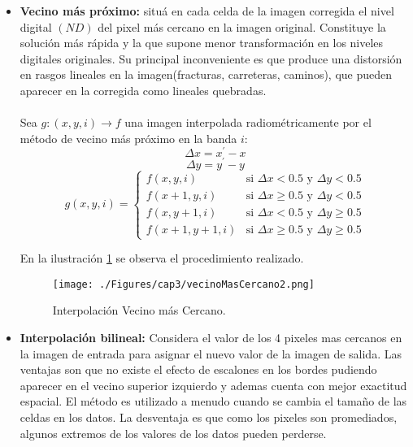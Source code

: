 	\begin{itemize}
		\item \textbf{Vecino m\'as pr\'oximo:} situ\'a en cada celda de la imagen corregida el nivel digital $ (ND) $ del pixel m\'as cercano en la imagen original. Constituye la soluci\'on m\'as r\'apida y la que supone menor transformaci\'on en los niveles digitales originales. Su principal inconveniente es que produce una distorsi\'on en rasgos lineales en la imagen(fracturas, carreteras, caminos), que pueden aparecer en la corregida como lineales quebradas. \\~\\
		Sea $ g:(x,y,i) \longrightarrow f$ una imagen interpolada radiom\'etricamente por el m\'etodo de vecino m\'as pr\'oximo en la banda $ i $:
		\begin{equation}
		\Delta x = x^{'}-x
		\end{equation}	
		\begin{equation}
		\Delta y = y^{'}-y
		\end{equation}	
\begin{equation}
	g(x,y,i) = \begin{cases}
		f(x,y,i) & \text{si }\Delta x < 0.5 \text{ y } \Delta y < 0.5\\
		f(x+1,y,i) & \text{si } \Delta x \geq 0.5 \text{ y } \Delta y < 0.5\\
		f(x,y+1,i) & \text{si } \Delta x < 0.5 \text{ y } \Delta y \geq 0.5\\
		f(x+1,y+1,i) & \text{si } \Delta x \geq 0.5 \text{ y } \Delta y \geq 0.5
	\end{cases}
\end{equation}	

		En la ilustraci\'on \ref{fig:vecinoMasCercano2} se observa el procedimiento realizado.
				    \begin{figure}[H]
				    	\centering
				    	\texttt{[image: ./Figures/cap3/vecinoMasCercano2.png]}
				    	\caption{Interpolaci\'on Vecino m\'as Cercano.}
				    	\label{fig:vecinoMasCercano2}
				    \end{figure}
		
		\item \textbf{Interpolaci\'on bilineal:} Considera el valor de los 4 pixeles mas cercanos en la imagen de entrada para asignar el nuevo valor de la imagen de salida. Las ventajas son que no existe el efecto de escalones en los bordes pudiendo aparecer en el vecino superior izquierdo y ademas cuenta con mejor exactitud espacial. El m\'etodo es utilizado a menudo cuando se cambia el tama\~{n}o de las celdas en los datos. La desventaja es que como los pixeles son promediados, algunos extremos de los valores de los datos pueden perderse.\\~\\
		

\end{itemize}
